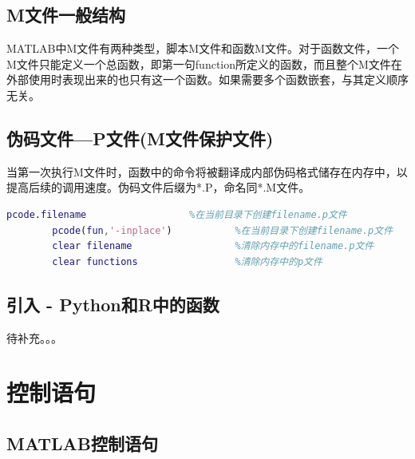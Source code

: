     \subsection{M文件一般结构}
        MATLAB中M文件有两种类型，脚本M文件和函数M文件。对于函数文件，一个M文件只能定义一个总函数，即第一句function所定义的函数，而且整个M文件在外部使用时表现出来的也只有这一个函数。如果需要多个函数嵌套，与其定义顺序无关。
    \subsection{伪码文件—P文件(M文件保护文件)}
        当第一次执行M文件时，函数中的命令将被翻译成内部伪码格式储存在内存中，以提高后续的调用速度。伪码文件后缀为*.P，命名同*.M文件。
            \begin{lstlisting}[language=Matlab]
        pcode.filename                  %在当前目录下创建filename.p文件
        pcode(fun,'-inplace')           %在当前目录下创建filename.p文件
        clear filename                  %清除内存中的filename.p文件
        clear functions                 %清除内存中的p文件
            \end{lstlisting}
    \subsection{引入 - Python和R中的函数}
        \par
        待补充。。。

\section{控制语句}
    \subsection{MATLAB控制语句}
